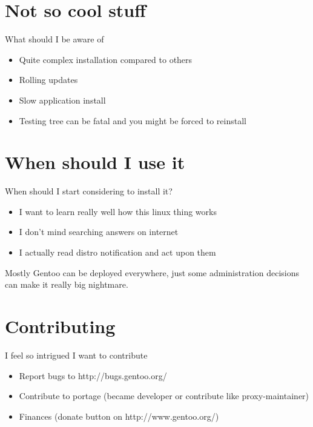 \documentclass{beamer}
\begin{document}
\section{Not so cool stuff}

\begin{frame}{What should I be aware of}
	\begin{itemize}
		\item Quite complex installation compared to others
		\item Rolling updates
		\item Slow application install
		\item Testing tree can be fatal and you might be forced to reinstall
	\end{itemize}
\end{frame}

\section{When  should I use it}
\begin{frame}{When should I start considering to install it?}
	\begin{itemize}
		\item I want to learn really well how this linux thing works
		\item I don't mind searching answers on internet
		\item I actually read distro notification and act upon them
	\end{itemize}
	Mostly Gentoo can be deployed everywhere, just some administration decisions can make it really big nightmare.
\end{frame}

\section{Contributing}
\begin{frame}{I feel so intrigued I want to contribute}
	\begin{itemize}
		\item Report bugs to http://bugs.gentoo.org/
		\item Contribute to portage (became developer or contribute like proxy-maintainer)
		\item Finances (donate button on http://www.gentoo.org/)
	\end{itemize}
\end{frame}

\end{document}
